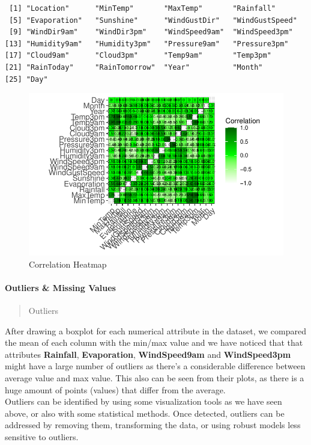 \documentclass[
  letterpaper,
  DIV=11,
  numbers=noendperiod]{scrartcl}
\let\oldparagraph\paragraph
\renewcommand{\paragraph}[1]{\oldparagraph{#1}\mbox{}}
\begin{document}
\begin{verbatim}
 [1] "Location"      "MinTemp"       "MaxTemp"       "Rainfall"     
 [5] "Evaporation"   "Sunshine"      "WindGustDir"   "WindGustSpeed"
 [9] "WindDir9am"    "WindDir3pm"    "WindSpeed9am"  "WindSpeed3pm" 
[13] "Humidity9am"   "Humidity3pm"   "Pressure9am"   "Pressure3pm"  
[17] "Cloud9am"      "Cloud3pm"      "Temp9am"       "Temp3pm"      
[21] "RainToday"     "RainTomorrow"  "Year"          "Month"        
[25] "Day"          
\end{verbatim}

\begin{figure}[H]

{\centering \includegraphics{RainAus_EDA_files/figure-pdf/fig-absences-1.pdf}

}

\caption{\label{fig-absences}Correlation Heatmap}

\end{figure}

\hypertarget{outliers-missing-values}{%
\paragraph{Outliers \& Missing Values}\label{outliers-missing-values}}

\begin{quote}
Outliers
\end{quote}

After drawing a boxplot for each numerical attribute in the dataset, we
compared the mean of each column with the min/max value and we have
noticed that that attributes \textbf{Rainfall}, \textbf{Evaporation},
\textbf{WindSpeed9am} and \textbf{WindSpeed3pm} might have a large
number of outliers as there's a considerable difference between average
value and max value. This also can be seen from their plots, as there is
a huge amount of points (values) that differ from the average.\\
Outliers can be identified by using some visualization tools as we have
seen above, or also with some statistical methods. Once detected,
outliers can be addressed by removing them, transforming the data, or
using robust models less sensitive to outliers.
\end{document}
